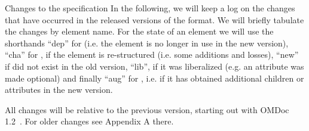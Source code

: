 \begin{omgroup}[creators=miko,id=changelog]{Changes to the specification}
In the following, we will keep a log on the changes that have occurred in the released
versions of the \omdoc format.  We will briefly tabulate the changes by element
name. For the state of an element we will use the shorthands ``dep'' for
{} (i.e. the element is no longer in use in the new \omdoc
version), ``cha'' for {}, if the element is re-structured (i.e.  some
additions and losses), ``new'' if did not exist in the old \omdoc version, ``lib'', if
it was liberalized (e.g. an attribute was made optional) and finally ``aug'' for
{}, i.e. if it has obtained additional children or attributes in the
new \omdoc version.

All changes will be relative to the previous version, starting out with OMDoc
1.2~\cite{Kohlhase:OMDoc1.2}. For older changes see Appendix A there.

\end{omgroup}

